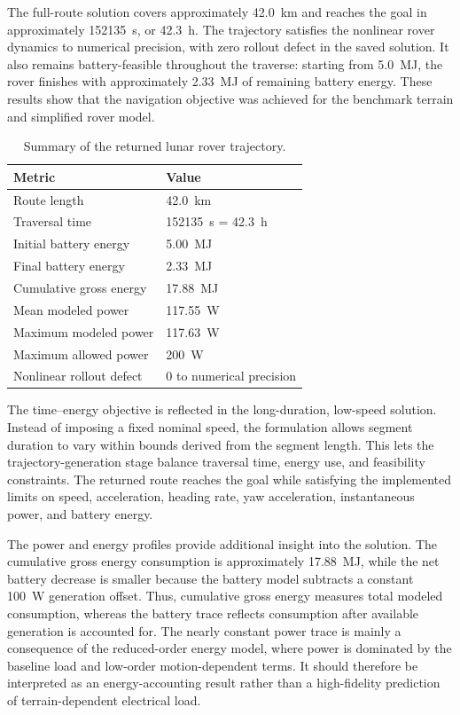 The full-route solution covers approximately \SI{42.0}{km} and reaches the goal in approximately \SI{152135}{s}, or \SI{42.3}{h}. The trajectory satisfies the nonlinear rover dynamics to numerical precision, with zero rollout defect in the saved solution. It also remains battery-feasible throughout the traverse: starting from \SI{5.0}{MJ}, the rover finishes with approximately \SI{2.33}{MJ} of remaining battery energy. These results show that the navigation objective was achieved for the benchmark terrain and simplified rover model.

\begin{table}[t]
\centering
\caption{Summary of the returned lunar rover trajectory.}
\label{tab:trajectory_summary}
\begin{tabular}{ll}
\toprule
Metric & Value \\
\midrule
Route length & \SI{42.0}{km} \\
Traversal time & \SI{152135}{s} = \SI{42.3}{h} \\
Initial battery energy & \SI{5.00}{MJ} \\
Final battery energy & \SI{2.33}{MJ} \\
Cumulative gross energy & \SI{17.88}{MJ} \\
Mean modeled power & \SI{117.55}{W} \\
Maximum modeled power & \SI{117.63}{W} \\
Maximum allowed power & \SI{200}{W} \\
Nonlinear rollout defect & $0$ to numerical precision \\
\bottomrule
\end{tabular}
\end{table}

The time--energy objective is reflected in the long-duration, low-speed solution. Instead of imposing a fixed nominal speed, the formulation allows segment duration to vary within bounds derived from the segment length. This lets the trajectory-generation stage balance traversal time, energy use, and feasibility constraints. The returned route reaches the goal while satisfying the implemented limits on speed, acceleration, heading rate, yaw acceleration, instantaneous power, and battery energy.

The power and energy profiles provide additional insight into the solution. The cumulative gross energy consumption is approximately \SI{17.88}{MJ}, while the net battery decrease is smaller because the battery model subtracts a constant \SI{100}{W} generation offset. Thus, cumulative gross energy measures total modeled consumption, whereas the battery trace reflects consumption after available generation is accounted for. The nearly constant power trace is mainly a consequence of the reduced-order energy model, where power is dominated by the baseline load and low-order motion-dependent terms. It should therefore be interpreted as an energy-accounting result rather than a high-fidelity prediction of terrain-dependent electrical load.

